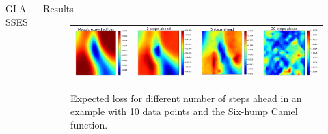 \documentclass[15pt,serif,mathserif,final]{beamer}
\begin{document}
\begin{frame}{}
\begin{columns}[t]
\begin{column}{0.32\linewidth}
\begin{block}{GLASSES}
\end{block}





    \end{column}%

    \begin{column}{0.32\linewidth}

      \begin{block}{Results}


\begin{figure}[t!]
\begin{tabular}{cccc}
      {\includegraphics[width=45mm]{1_ahead.pdf}} &
      {\includegraphics[width=47mm]{2_ahead.pdf}}  &
      {\includegraphics[width=45mm]{5_ahead.pdf}} &
      {\includegraphics[width=47mm]{20_ahead.pdf}}\\
\end{tabular}\caption{Expected loss for different number of steps ahead in an example with 10 data points and the Six-hump Camel function. }\label{table:n_ahead}
\end{figure}


\end{block}
\end{column}
\end{columns}
\end{frame}
\end{document}
